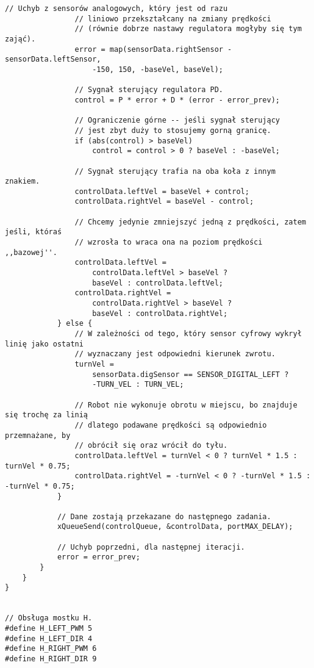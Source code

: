 \documentclass[11pt]{article}
\begin{document}
\begin{appendices}
\begin{lstlisting}[basicstyle = \ttfamily \footnotesize]
                // Uchyb z sensorów analogowych, który jest od razu
                // liniowo przekształcany na zmiany prędkości
                // (równie dobrze nastawy regulatora mogłyby się tym zająć).
                error = map(sensorData.rightSensor - sensorData.leftSensor,
                	-150, 150, -baseVel, baseVel);

                // Sygnał sterujący regulatora PD.
                control = P * error + D * (error - error_prev);

                // Ograniczenie górne -- jeśli sygnał sterujący
                // jest zbyt duży to stosujemy gorną granicę.
                if (abs(control) > baseVel)
                    control = control > 0 ? baseVel : -baseVel;

                // Sygnał sterujący trafia na oba koła z innym znakiem.
                controlData.leftVel = baseVel + control;
                controlData.rightVel = baseVel - control;

                // Chcemy jedynie zmniejszyć jedną z prędkości, zatem jeśli, któraś
                // wzrosła to wraca ona na poziom prędkości ,,bazowej''.    
                controlData.leftVel =
                	controlData.leftVel > baseVel ?
                	baseVel : controlData.leftVel;
                controlData.rightVel =
                	controlData.rightVel > baseVel ?
                	baseVel : controlData.rightVel;
            } else {
                // W zależności od tego, który sensor cyfrowy wykrył linię jako ostatni
                // wyznaczany jest odpowiedni kierunek zwrotu.                
                turnVel =
                	sensorData.digSensor == SENSOR_DIGITAL_LEFT ?
                	-TURN_VEL : TURN_VEL;

                // Robot nie wykonuje obrotu w miejscu, bo znajduje się trochę za linią
                // dlatego podawane prędkości są odpowiednio przemnażane, by
                // obrócił się oraz wrócił do tyłu.
                controlData.leftVel = turnVel < 0 ? turnVel * 1.5 : turnVel * 0.75;
                controlData.rightVel = -turnVel < 0 ? -turnVel * 1.5 : -turnVel * 0.75;
            }

            // Dane zostają przekazane do następnego zadania.
            xQueueSend(controlQueue, &controlData, portMAX_DELAY);
            
            // Uchyb poprzedni, dla następnej iteracji.
            error = error_prev;
        }
    }
}


// Obsługa mostku H.
#define H_LEFT_PWM 5
#define H_LEFT_DIR 4
#define H_RIGHT_PWM 6
#define H_RIGHT_DIR 9


\end{lstlisting}
\end{appendices}
\end{document}
